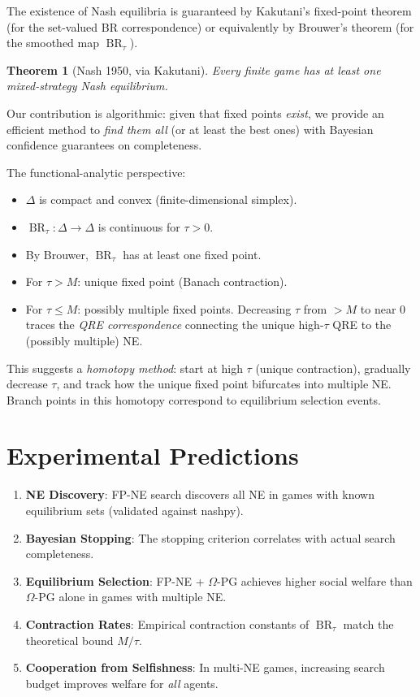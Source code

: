 \documentclass[11pt,a4paper]{article}
\newtheorem{theorem}{Theorem}[section]
\DeclareMathOperator{\BR}{BR}
\begin{document}
The existence of Nash equilibria is guaranteed by Kakutani's fixed-point
theorem (for the set-valued BR correspondence) or equivalently by
Brouwer's theorem (for the smoothed map $\BR_\tau$).

\begin{theorem}[Nash 1950, via Kakutani]
Every finite game has at least one mixed-strategy Nash equilibrium.
\end{theorem}

Our contribution is algorithmic: given that fixed points \emph{exist},
we provide an efficient method to \emph{find them all} (or at least
the best ones) with Bayesian confidence guarantees on completeness.

The functional-analytic perspective:
\begin{itemize}
    \item $\Delta$ is compact and convex (finite-dimensional simplex).
    \item $\BR_\tau : \Delta \to \Delta$ is continuous for $\tau > 0$.
    \item By Brouwer, $\BR_\tau$ has at least one fixed point.
    \item For $\tau > M$: unique fixed point (Banach contraction).
    \item For $\tau \leq M$: possibly multiple fixed points.
    Decreasing $\tau$ from $> M$ to near $0$ traces the \emph{QRE
    correspondence} connecting the unique high-$\tau$ QRE to the
    (possibly multiple) NE.
\end{itemize}

This suggests a \emph{homotopy method}: start at high $\tau$ (unique
contraction), gradually decrease $\tau$, and track how the unique
fixed point bifurcates into multiple NE. Branch points in this
homotopy correspond to equilibrium selection events.


\section{Experimental Predictions}
\label{sec:predictions}

\begin{enumerate}
    \item \textbf{NE Discovery}: FP-NE search discovers all NE in games
    with known equilibrium sets (validated against nashpy).
    \item \textbf{Bayesian Stopping}: The stopping criterion correlates
    with actual search completeness.
    \item \textbf{Equilibrium Selection}: FP-NE + $\Omega$-PG achieves
    higher social welfare than $\Omega$-PG alone in games with multiple NE.
    \item \textbf{Contraction Rates}: Empirical contraction constants
    of $\BR_\tau$ match the theoretical bound $M/\tau$.
    \item \textbf{Cooperation from Selfishness}: In multi-NE games,
    increasing search budget improves welfare for \emph{all} agents.
\end{enumerate}
\end{document}
